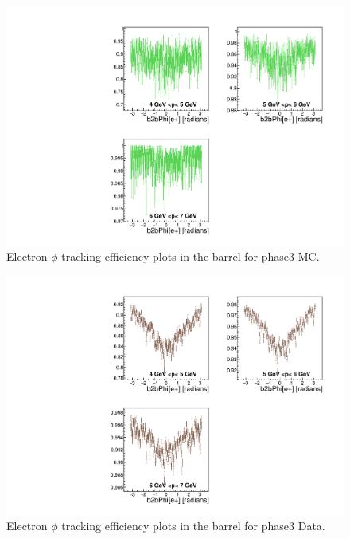\documentclass[a4paper,11pt,twosided,final,german,openbib,pdftex,listof=totoc,bibliography=totoc]{scrbook}
\begin{document}
\begin{appendix}






\begin{figure}[!htbp]
	\centering
	\includegraphics[width=\textwidth]{Plots/master3/xPMPhiemBarrel_MCP3}
	\caption[Momentum $\phi$ Electron Barrel Efficiency Phase3 MC]{Electron $\phi$ tracking efficiency plots in the barrel for phase3 MC.}
	\label{plt:PMPhiemBarrel3_MC}
\end{figure}


\begin{figure}[!htbp]
	\centering
	\includegraphics[width=\textwidth]{Plots/master3/xPMPhiemBarrel_DataP3}
	\caption[Momentum $\phi$ Electron Barrel Efficiency Phase3 Data]{Electron $\phi$ tracking efficiency plots in the barrel for phase3 Data.}
	\label{plt:PMPhiemBarrel3_Data}
\end{figure}







\end{appendix}
\end{document}
